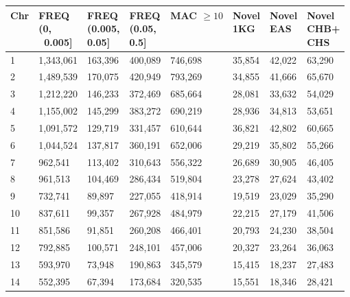\begin{table}[!ht]
    \centering
    \begin{tabular}{|l|l|l|l|l|l|l|l|}
    \hline
        Chr & \shortstack{FREQ\\ (0,\\\ 0.005]} & \shortstack{FREQ\\ (0.005,\\ 0.05]} & \shortstack{FREQ\\ (0.05,\\ 0.5]}  & \shortstack{MAC\\  $\ge 10$} & \shortstack{Novel\\ 1KG}& \shortstack{Novel\\ EAS} & 
        \shortstack{Novel\\ CHB+\\ CHS}\\ \hline
        1 & 1,343,061 & 163,396 & 400,089 & 746,698 & 35,854 & 42,022 & 63,290 \\ \hline
        2 & 1,489,539 & 170,075 & 420,949 & 793,269 & 34,855 & 41,666 & 65,670 \\ \hline
        3 & 1,212,220 & 146,233 & 372,469 & 685,664 & 28,081 & 33,632 & 54,029 \\ \hline
        4 & 1,155,002 & 145,299 & 383,272 & 690,219 & 28,936 & 34,813 & 53,651 \\ \hline
        5 & 1,091,572 & 129,719 & 331,457 & 610,644 & 36,821 & 42,802 & 60,665 \\ \hline
        6 & 1,044,524 & 137,817 & 360,191 & 652,006 & 29,219 & 35,802 & 55,266 \\ \hline
        7 & 962,541 & 113,402 & 310,643 & 556,322 & 26,689 & 30,905 & 46,405 \\ \hline
        8 & 961,513 & 104,469 & 286,434 & 519,804 & 23,278 & 27,624 & 43,402 \\ \hline
        9 & 732,741 & 89,897 & 227,055 & 418,914 & 19,519 & 23,029 & 35,290 \\ \hline
        10 & 837,611 & 99,357 & 267,928 & 484,979 & 22,215 & 27,179 & 41,506 \\ \hline
        11 & 851,586 & 91,851 & 260,208 & 466,401 & 20,793 & 24,230 & 38,504 \\ \hline
        12 & 792,885 & 100,571 & 248,101 & 457,006 & 20,327 & 23,264 & 36,063 \\ \hline
        13 & 593,970 & 73,948 & 190,863 & 345,579 & 15,415 & 18,237 & 27,483 \\ \hline
        14 & 552,395 & 67,394 & 173,684 & 320,535 & 15,551 & 18,346 & 28,421 \\ \hline

\end{tabular}
\end{table}
